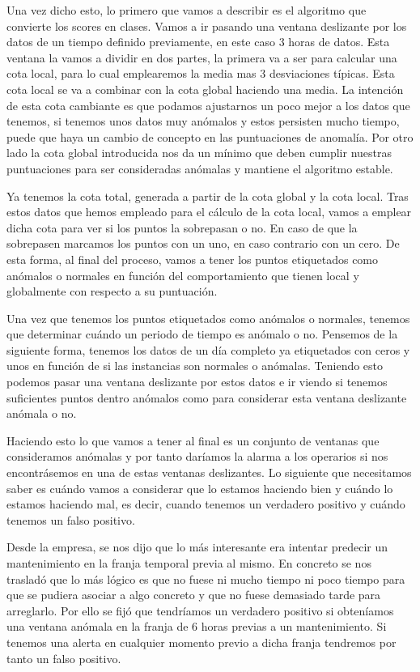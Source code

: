 Una vez dicho esto, lo primero que vamos a describir es el algoritmo que convierte los scores en clases. Vamos a ir pasando una ventana deslizante por los datos de un tiempo definido previamente, en este caso 3 horas de datos. Esta ventana la vamos a dividir en dos partes, la primera va a ser para calcular una cota local, para lo cual emplearemos la media mas 3 desviaciones típicas. Esta cota local se va a combinar con la cota global haciendo una media. La intención de esta cota cambiante es que podamos ajustarnos un poco mejor a los datos que tenemos, si tenemos unos datos muy anómalos y estos persisten mucho tiempo, puede que haya un cambio de concepto en las puntuaciones de anomalía. Por otro lado la cota global introducida nos da un mínimo que deben cumplir nuestras puntuaciones para ser consideradas anómalas y mantiene el algoritmo estable.

Ya tenemos la cota total, generada a partir de la cota global y la cota local. Tras estos datos que hemos empleado para el cálculo de la cota local, vamos a emplear dicha cota para ver si los puntos la sobrepasan o no. En caso de que la sobrepasen marcamos los puntos con un uno, en caso contrario con un cero. De esta forma, al final del proceso, vamos a tener los puntos etiquetados como anómalos o normales en función del comportamiento que tienen local y globalmente con respecto a su puntuación.

Una vez que tenemos los puntos etiquetados como anómalos o normales, tenemos que determinar cuándo un periodo de tiempo es anómalo o no. Pensemos de la siguiente forma, tenemos los datos de un día completo ya etiquetados con ceros y unos en función de si las instancias son normales o anómalas. Teniendo esto podemos pasar una ventana deslizante por estos datos e ir viendo si tenemos suficientes puntos dentro anómalos como para considerar esta ventana deslizante anómala o no. 

Haciendo esto lo que vamos a tener al final es un conjunto de ventanas que consideramos anómalas y por tanto daríamos la alarma a los operarios si nos encontrásemos en una de estas ventanas deslizantes. Lo siguiente que necesitamos saber es cuándo vamos a considerar que lo estamos haciendo bien y cuándo lo estamos haciendo mal, es decir, cuando tenemos un verdadero positivo y cuándo tenemos un falso positivo. 

Desde la empresa, se nos dijo que lo más interesante era intentar predecir un mantenimiento en la franja temporal previa al mismo. En concreto se nos trasladó que lo más lógico es que no fuese ni mucho tiempo ni poco tiempo para que se pudiera asociar a algo concreto y que no fuese demasiado tarde para arreglarlo. Por ello se fijó que tendríamos un verdadero positivo si obteníamos una ventana anómala en la franja de 6 horas previas a un mantenimiento. Si tenemos una alerta en cualquier momento previo a dicha franja tendremos por tanto un falso positivo.

